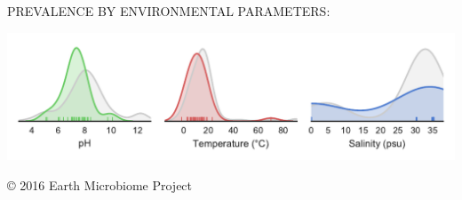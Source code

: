 \documentclass[10pt]{amsart}
\begin{document}
\begin{framed}
\begin{raggedright}
PREVALENCE BY ENVIRONMENTAL PARAMETERS:

\vspace{-3mm}

\begin{center}
\includegraphics[width=\textwidth]{envparams.pdf}
\end{center}

\end{raggedright}


\begin{center}
    \copyright{} 2016 Earth Microbiome Project
\end{center}

\end{framed}
\end{document}
